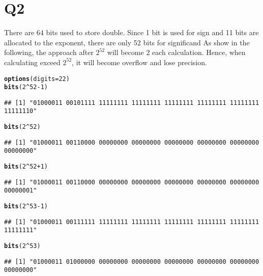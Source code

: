 \documentclass{article}\usepackage[]{graphicx}\usepackage[]{color}
\makeatletter
\newcommand{\hlnum}[1]{\textcolor[rgb]{0.686,0.059,0.569}{#1}}%
\newcommand{\hlopt}[1]{\textcolor[rgb]{0,0,0}{#1}}%
\newcommand{\hlstd}[1]{\textcolor[rgb]{0.345,0.345,0.345}{#1}}%
\newcommand{\hlkwc}[1]{\textcolor[rgb]{0.333,0.667,0.333}{#1}}%
\newcommand{\hlkwd}[1]{\textcolor[rgb]{0.737,0.353,0.396}{\textbf{#1}}}%
\newenvironment{kframe}{%
 \def\at@end@of@kframe{}%
 \ifinner\ifhmode%
  \def\at@end@of@kframe{\end{minipage}}%
  \begin{minipage}{\columnwidth}%
 \fi\fi%
 \def\FrameCommand##1{\hskip\@totalleftmargin \hskip-\fboxsep
 \colorbox{shadecolor}{##1}\hskip-\fboxsep
     \hskip-\linewidth \hskip-\@totalleftmargin \hskip\columnwidth}%
 \MakeFramed {\advance\hsize-\width
   \@totalleftmargin\z@ \linewidth\hsize
   \@setminipage}}%
 {\par\unskip\endMakeFramed%
 \at@end@of@kframe}
\newenvironment{knitrout}{}{} %
\makeatother
\begin{document}
\section{Q2}
There are $64$ bits used to store double. Since 1 bit is used for sign and 11 bits are allocated to the exponent, there are only 52 bits for significand
As show in the following, the approach after $2^{52}$ will become $2$ each calculation. Hence, when calculating exceed $2^{52}$, it will become overflow and lose precision. 
\begin{knitrout}
\color{fgcolor}\begin{kframe}
\begin{alltt}
\hlkwd{options}\hlstd{(}\hlkwc{digits} \hlstd{=} \hlnum{22}\hlstd{)}
\hlkwd{bits}\hlstd{(}\hlnum{2}\hlopt{^}\hlnum{52} \hlopt{-} \hlnum{1}\hlstd{)}
\end{alltt}
\begin{verbatim}
## [1] "01000011 00101111 11111111 11111111 11111111 11111111 11111111 11111110"
\end{verbatim}
\begin{alltt}
\hlkwd{bits}\hlstd{(}\hlnum{2}\hlopt{^}\hlnum{52}\hlstd{)}
\end{alltt}
\begin{verbatim}
## [1] "01000011 00110000 00000000 00000000 00000000 00000000 00000000 00000000"
\end{verbatim}
\begin{alltt}
\hlkwd{bits}\hlstd{(}\hlnum{2}\hlopt{^}\hlnum{52} \hlopt{+} \hlnum{1}\hlstd{)}
\end{alltt}
\begin{verbatim}
## [1] "01000011 00110000 00000000 00000000 00000000 00000000 00000000 00000001"
\end{verbatim}
\begin{alltt}
\hlkwd{bits}\hlstd{(}\hlnum{2}\hlopt{^}\hlnum{53} \hlopt{-} \hlnum{1}\hlstd{)}
\end{alltt}
\begin{verbatim}
## [1] "01000011 00111111 11111111 11111111 11111111 11111111 11111111 11111111"
\end{verbatim}
\begin{alltt}
\hlkwd{bits}\hlstd{(}\hlnum{2}\hlopt{^}\hlnum{53}\hlstd{)}
\end{alltt}
\begin{verbatim}
## [1] "01000011 01000000 00000000 00000000 00000000 00000000 00000000 00000000"
\end{verbatim}
\begin{alltt}

\end{alltt}
\end{kframe}
\end{knitrout}
\end{document}
